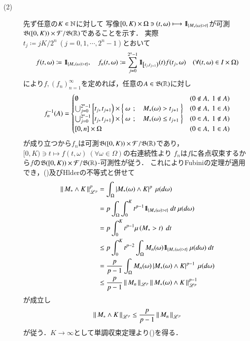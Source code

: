 \begin{prf}
\begin{description}
			\item[(2)] 先ず任意の$K \in \mathbb{N}$に対して
				写像$[0,K) \times \Omega \ni (t,\omega) \longmapsto \mbox{1}\hspace{-0.25em}\mbox{l}_{\left\{ M_*(\omega) > t \right\}}$が可測$\mathfrak{B}([0,K))\times\mathcal{F}/\mathfrak{B}(\mathbb{R})$であることを示す．
				実際$t_j \coloneqq jK/2^n\ (j=0,1,\cdots,2^n-1)$とおいて
				\begin{align}
					f(t,\omega) \coloneqq \mbox{1}\hspace{-0.25em}\mbox{l}_{\left\{ M_*(\omega) > t \right\}},
					\quad f_n(t,\omega) \coloneqq \sum_{j=0}^{2^n-1} \mbox{1}\hspace{-0.25em}\mbox{l}_{\left[t_j,t_{j+1}\right)}(t) f(t_j,\omega)
					\quad (\forall (t,\omega) \in I \times \Omega)
				\end{align}
				により$f,(f_n)_{n=1}^{\infty}$を定めれば，任意の$A \in \mathfrak{B}(\mathbb{R})$に対し
				\begin{align}
					f_n^{-1}(A) = 
					\begin{cases}
						\emptyset & (0 \notin A,\ 1 \notin A) \\
						\bigcup_{j=0}^{2^n-1} \left[ t_j,t_{j+1} \right) \times \left\{\ \omega\ \, ; \quad M_*(\omega) > t_{j+1}\ \right\} & (0 \notin A,\ 1 \in A) \\
						\bigcup_{j=0}^{2^n-1} \left[ t_j,t_{j+1} \right) \times \left\{\ \omega\ \, ; \quad M_*(\omega) \leq t_{j+1}\ \right\} & (0 \in A,\ 1 \notin A) \\
						[0,n] \times \Omega & (0 \in A,\ 1 \in A)
					\end{cases}
				\end{align}
				が成り立つから$f_n$は可測$\mathfrak{B}([0,K))\times\mathcal{F}/\mathfrak{B}(\mathbb{R})$であり，
				$[0,K) \ni t \longmapsto f(t,\omega)\ (\forall \omega \in \Omega)$の右連続性より
				$f_n$は$f$に各点収束するから$f$の$\mathfrak{B}([0,K))\times\mathcal{F}/\mathfrak{B}(\mathbb{R})$-可測性が従う．
				これによりFubiniの定理が適用でき，()及びHlderの不等式と併せて
				\begin{align}
					\left\|\, M_* \wedge K\, \right\|_{\mathscr{L}^p}^p &= \int_{\Omega} \left|M_*(\omega) \wedge K\right|^p\ \mu(d\omega) \\
					&= p \int_{\Omega} \int_0^K t^{p-1} \mbox{1}\hspace{-0.25em}\mbox{l}_{\left\{M_*(\omega) > t\right\}}\ dt\ \mu(d\omega) \\
					&= p \int_0^K t^{p-1} \mu\left(M_* > t\right)\ dt \\
					&\leq p \int_0^K t^{p-2} \int_\Omega M_n(\omega) \mbox{1}\hspace{-0.25em}\mbox{l}_{\left\{M_*(\omega) > t\right\}}\ \mu(d\omega)\ dt \\
					&= \frac{p}{p-1} \int_\Omega M_n(\omega) \left| M_*(\omega) \wedge K \right|^{p-1}\ \mu(d\omega) \\
					&\leq \frac{p}{p-1} \left\|\, M_n\, \right\|_{\mathscr{L}^p} \left\|\, M_*(\omega) \wedge K\, \right\|_{\mathscr{L}^p}^{p-1} 
				\end{align}
				が成立し
				\begin{align}
					\left\|\, M_* \wedge K\, \right\|_{\mathscr{L}^p} \leq \frac{p}{p-1} \left\|\, M_n\, \right\|_{\mathscr{L}^p}
				\end{align}
				が従う．$K \longrightarrow \infty$として単調収束定理より()を得る．
				\QED
		\end{description}
		
	\end{prf}
	
